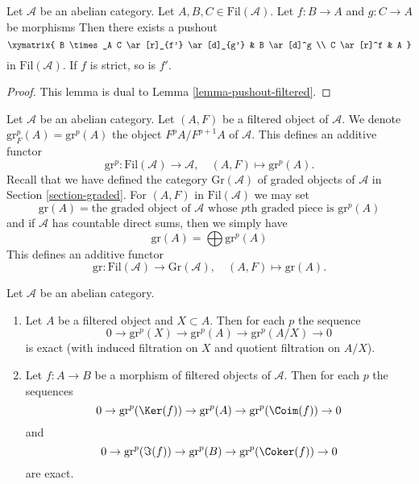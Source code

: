 \begin{lemma}
\label{lemma-fibre-product-filtered}
Let $\mathcal{A}$ be an abelian category.
Let $A, B, C \in \text{Fil}(\mathcal{A})$.
Let $f : B \to A$ and $g : C \to A$ be morphisms
Then there exists a pushout
$$
\xymatrix{
B \times_A C \ar[r]_{f'} \ar[d]_{g'} & B \ar[d]^g \\
C \ar[r]^f & A
}
$$
in $\text{Fil}(\mathcal{A})$. If $f$ is strict, so is $f'$.
\end{lemma}

\begin{proof}
This lemma is dual to
Lemma \ref{lemma-pushout-filtered}.
\end{proof}

\noindent
Let $\mathcal{A}$ be an abelian category. Let $(A, F)$ be a filtered
object of $\mathcal{A}$. We denote $\text{gr}^p_F(A) = \text{gr}^p(A)$
the object $F^pA/F^{p + 1}A$ of $\mathcal{A}$. This defines an
additive functor
$$
\text{gr}^p :
\text{Fil}(\mathcal{A})
\longrightarrow
\mathcal{A}, \quad
(A, F)
\longmapsto
\text{gr}^p(A).
$$
Recall that we have defined the category $\text{Gr}(\mathcal{A})$
of graded objects of $\mathcal{A}$ in Section \ref{section-graded}.
For $(A, F)$ in $\text{Fil}(\mathcal{A})$ we may set
$$
\text{gr}(A) = \text{the graded object of }\mathcal{A}\text{ whose }
p\text{th graded piece is }\text{gr}^p(A)
$$
and if $\mathcal{A}$ has countable direct sums, then we simply have
$$
\text{gr}(A) = \bigoplus \text{gr}^p(A)
$$
This defines an additive functor
$$
\text{gr} :
\text{Fil}(\mathcal{A})
\longrightarrow
\text{Gr}(\mathcal{A}), \quad
(A, F) \longmapsto \text{gr}(A).
$$

\begin{lemma}
\label{lemma-ses-gr}
Let $\mathcal{A}$ be an abelian category.
\begin{enumerate}
\item Let $A$ be a filtered object and $X \subset A$. Then for each $p$
the sequence
$$
0 \to \text{gr}^p(X) \to \text{gr}^p(A) \to \text{gr}^p(A/X) \to 0
$$
is exact (with induced filtration on $X$ and quotient filtration on $A/X$).
\item Let $f : A \to B$ be a morphism of filtered objects of $\mathcal{A}$.
Then for each $p$ the sequences
$$
0 \to \text{gr}^p(\Ker(f)) \to \text{gr}^p(A) \to
\text{gr}^p(\Coim(f)) \to 0
$$
and
$$
0 \to \text{gr}^p(\Im(f)) \to \text{gr}^p(B) \to
\text{gr}^p(\Coker(f)) \to 0
$$
are exact.
\end{enumerate}
\end{lemma}

